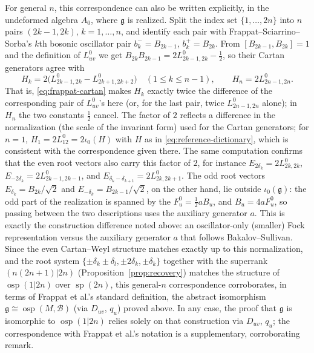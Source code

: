 \documentclass[11pt]{article}
\numberwithin{equation}{section}
\theoremstyle{remark}
\begin{document}
For general $n$, this correspondence can also be written explicitly, in the
undeformed algebra $A_0$, where $\mathfrak g$ is realized. Split
the index set $\{1,\ldots,2n\}$ into $n$ pairs $(2k-1,2k)$,
$k=1,\ldots,n$, and identify each pair with Frappat--Sciarrino--Sorba's
$k$th bosonic oscillator pair $b_k^{-}=B_{2k-1}$, $b_k^{+}=B_{2k}$. From
$[B_{2k-1},B_{2k}]=1$ and the definition of $L^0_{uv}$ we get
$B_{2k}B_{2k-1}=2L^0_{2k-1,2k}-\tfrac{1}{2}$, so their Cartan generators agree with
\begin{equation}\label{eq:frappat-cartan}
 H_k=2\bigl(L^0_{2k-1,2k}-L^0_{2k+1,2k+2}\bigr)\quad(1\le k\le n-1),
 \qquad
 H_n=2L^0_{2n-1,2n}.
\end{equation}
That is, \eqref{eq:frappat-cartan} makes $H_k$ exactly twice the difference of the corresponding pair of
$L^0_{uv}$'s here (or, for the last pair, twice $L^0_{2n-1,2n}$ alone); in
$H_n$ the two constants $\tfrac{1}{2}$ cancel. The
factor of $2$ reflects a difference in the normalization (the scale of the
invariant form) used for the Cartan generators; for $n=1$,
$H_1=2L^0_{12}=2\iota_0(H)$ with $H$ as in \eqref{eq:reference-dictionary},
which is consistent with the correspondence given there. The same computation
confirms that the even root vectors also carry this factor of $2$, for instance
$E_{2\delta_k}=2L^0_{2k,2k}$, $E_{-2\delta_k}=2L^0_{2k-1,2k-1}$, and
$E_{\delta_k-\delta_{k+1}}=2L^0_{2k,2k+1}$. The odd root vectors
$E_{\delta_k}=B_{2k}/\sqrt2$ and $E_{-\delta_k}=B_{2k-1}/\sqrt2$, on the
other hand, lie outside $\iota_0(\mathfrak g)$: the odd part of the
realization is spanned by the $F^0_u=\tfrac{1}{2}aB_u$, and $B_u=4aF^0_u$, so
passing between the two descriptions uses the auxiliary generator $a$. This
is exactly the
construction difference noted above: an oscillator-only (smaller) Fock
representation versus the auxiliary generator $a$ that follows
Bakalov--Sullivan. Since the even Cartan--Weyl structure matches exactly up to
this normalization, and the root system
$\{\pm\delta_k\pm\delta_l,\pm2\delta_k,\pm\delta_k\}$ together with the
superrank $(n(2n+1)|2n)$ (Proposition~\ref{prop:recovery}) matches the
structure of $\operatorname{osp}(1|2n)$ over $\operatorname{sp}(2n)$,
this general-$n$ correspondence corroborates, in terms of Frappat et al.'s
standard definition, the abstract isomorphism
$\mathfrak g\cong\operatorname{osp}(M,\mathcal B)$ (via $D_{uv}$, $q_u$)
proved above. In any case, the proof that $\mathfrak g$ is isomorphic to
$\operatorname{osp}(1|2n)$ relies solely on that construction via
$D_{uv}$, $q_u$; the correspondence with Frappat et al.'s notation is a
supplementary, corroborating remark.
\end{document}
